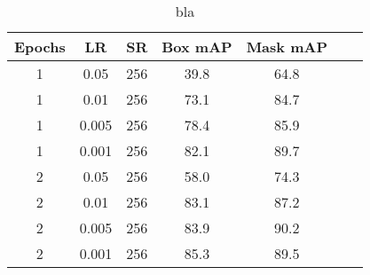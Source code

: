 \newpage
\begin{table}
	\centering
	\caption[Detection evaluation]{bla}
	\label{tab:detection_eval}
	\begin{tabular}[H!]{ccccccc}
		\toprule
		\textbf{Epochs} & \textbf{LR} & \textbf{SR} & \textbf{Box mAP} & \textbf{Mask mAP} \\
		\midrule
		1               & 0.05        & 256         & 39.8             & 64.8              \\
		1               & 0.01        & 256         & 73.1             & 84.7              \\
		1               & 0.005       & 256         & 78.4             & 85.9              \\
		1               & 0.001       & 256         & 82.1             & 89.7              \\
		2               & 0.05        & 256         & 58.0             & 74.3              \\
		2               & 0.01        & 256         & 83.1             & 87.2              \\
		2               & 0.005       & 256         & 83.9             & 90.2              \\
		2               & 0.001       & 256         & 85.3             & 89.5              \\
		\bottomrule
	\end{tabular}
\end{table}

